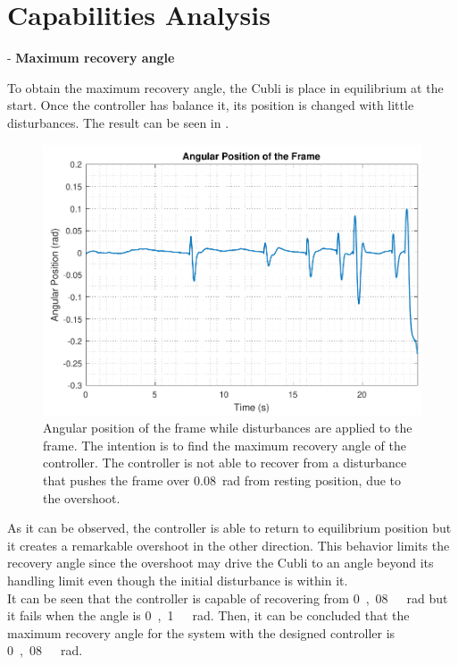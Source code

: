 \section{Capabilities Analysis}
- \textbf{Maximum recovery angle}

To obtain the maximum recovery angle, the Cubli is place in equilibrium at the start. Once the controller has balance it, its position is changed with little disturbances. The result can be seen in .

\begin{figure}[H]
	\centering
	\includegraphics[scale=0.62]{figures/testRecovery}
	\caption{Angular position of the frame while disturbances are applied to the frame. The intention is to find the maximum recovery angle of the controller. The controller is not able to recover from a disturbance that pushes the frame over \SI{0,08}{rad} from resting position, due to the overshoot.}
	\label{testRecovery}
\end{figure}\vspace{-5mm}
%
As it can be observed, the controller is able to return to equilibrium position but it creates a remarkable overshoot in the other direction. This behavior limits the recovery angle since the overshoot may drive the Cubli to an angle beyond its handling limit even though the initial disturbance is within it.\\
It can be seen that the controller is capable of recovering from \si{0,08\ rad} but it fails when the angle is \si{0,1\ rad}. Then, it can be concluded that the maximum recovery angle for the system with the designed controller is \si{0,08\ rad}.

